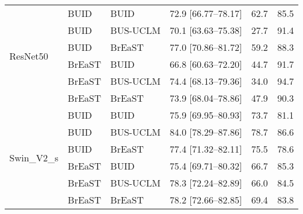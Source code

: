 \begin{tabular}{lllccc}
\midrule
\multirow{6}{*}{ResNet50} & BUID & BUID & 72.9 [66.77--78.17] & 62.7 & 85.5\\ 
 & BUID & BUS-UCLM & 70.1 [63.63--75.38] & 27.7 & 91.4\\ 
 & BUID & BrEaST & 77.0 [70.86--81.72] & 59.2 & 88.3\\ 
 & BrEaST & BUID & 66.8 [60.63--72.20] & 44.7 & 91.7\\ 
 & BrEaST & BUS-UCLM & 74.4 [68.13--79.36] & 34.0 & 94.7\\ 
 & BrEaST & BrEaST & 73.9 [68.04--78.86] & 47.9 & 90.3\\ 
\midrule
\multirow{6}{*}{Swin_V2_s} & BUID & BUID & 75.9 [69.95--80.93] & 73.7 & 81.1\\ 
 & BUID & BUS-UCLM & 84.0 [78.29--87.86] & 78.7 & 86.6\\ 
 & BUID & BrEaST & 77.4 [71.32--82.11] & 75.5 & 78.6\\ 
 & BrEaST & BUID & 75.4 [69.71--80.32] & 66.7 & 85.3\\ 
 & BrEaST & BUS-UCLM & 78.3 [72.24--82.89] & 66.0 & 84.5\\ 
 & BrEaST & BrEaST & 78.2 [72.66--82.85] & 69.4 & 83.8\\ 
\bottomrule
\end{tabular}
